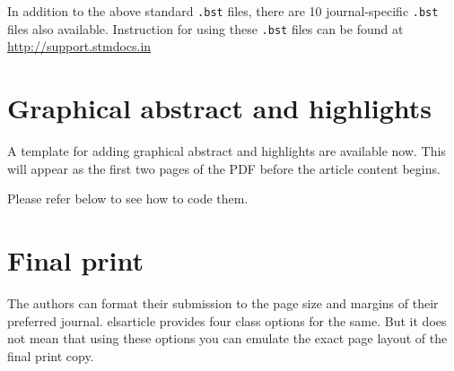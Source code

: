 \documentclass[a4paper,12pt]{article}
\def\file#1{\textsf{#1}\xspace}
\begin{document}
In addition to the above standard \verb+.bst+ files, there are 10
journal-specific \verb+.bst+ files also available.
Instruction for using these \verb+.bst+ files can be found at 
\href{http://support.stmdocs.in/wiki/index.php?title=Model-wise_bibliographic_style_files}
{http://support.stmdocs.in}

\section[Graphical ...]{Graphical abstract and highlights}
A template for adding graphical abstract and highlights are available
now. This will appear as the first two pages of the PDF before the
article content begins.

\pagebreak
Please refer below to see how to code them.


\vspace*{-1pc}
\section{Final print}\label{sec:final}

The authors can format their submission to the page size and margins
of their preferred journal.  \file{elsarticle} provides four
class options for the same. But it does not mean that using these
options you can emulate the exact page layout of the final print copy. 
\end{document}
